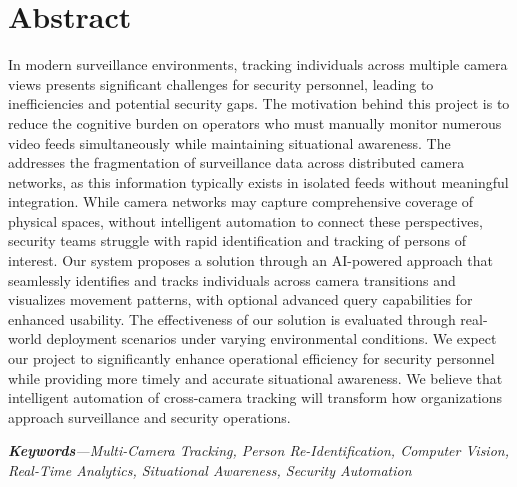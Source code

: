 \chapter*{Abstract}
\label{chap:abstract}

In modern surveillance environments, tracking individuals across multiple camera views presents significant challenges for security personnel, leading to inefficiencies and potential security gaps. The motivation behind this project is to reduce the cognitive burden on operators who must manually monitor numerous video feeds simultaneously while maintaining situational awareness. The \usevar{\srsTitle} addresses the fragmentation of surveillance data across distributed camera networks, as this information typically exists in isolated feeds without meaningful integration. While camera networks may capture comprehensive coverage of physical spaces, without intelligent automation to connect these perspectives, security teams struggle with rapid identification and tracking of persons of interest. Our system proposes a solution through an AI-powered approach that seamlessly identifies and tracks individuals across camera transitions and visualizes movement patterns, with optional advanced query capabilities for enhanced usability. The effectiveness of our solution is evaluated through real-world deployment scenarios under varying environmental conditions. We expect our project to significantly enhance operational efficiency for security personnel while providing more timely and accurate situational awareness. We believe that intelligent automation of cross-camera tracking will transform how organizations approach surveillance and security operations.

\par
\textit{\textbf{Keywords}---Multi-Camera Tracking, Person Re-Identification, Computer Vision, Real-Time Analytics, Situational Awareness, Security Automation}